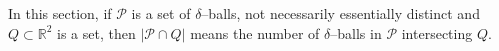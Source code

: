 \documentclass{amsart}
\newtheorem{lemma}[prop]{Lemma}
\newcommand{\T}{\mathcal{T}}
\newcommand{\eps}{\varepsilon}
\newcommand{\leapp}{\lessapprox}
\newcommand{\lesim}{\lesssim}
\newcommand{\bp}{\mathbf{p}}
\newcommand{\bT}{\mathbf{T}}
\newcommand{\cD}{\mathcal{D}}
\newcommand{\cT}{\mathcal{T}}
\newcommand{\cP}{\mathcal{P}}
\begin{document}



In this section, if $\cP$ is a set of $\delta$--balls, not necessarily essentially distinct and $Q\subset \mathbb{R}^2$ is a set, then $|\cP\cap Q|$ means the number of $\delta$--balls in $\cP$ intersecting $Q$.
\end{document}
